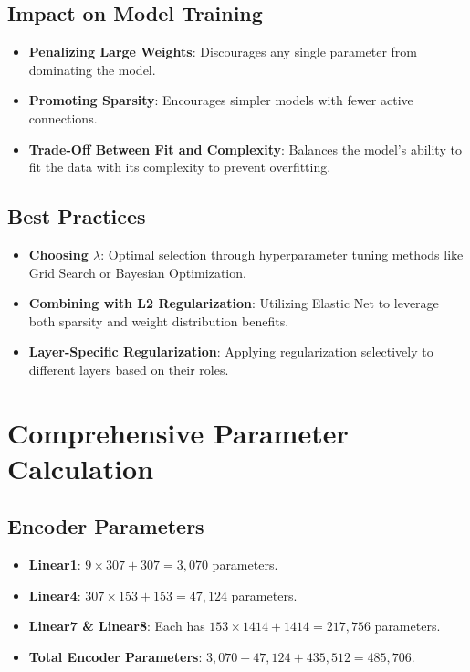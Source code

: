 \documentclass[10pt]{article}
\begin{document}
\subsection{Impact on Model Training}
\begin{itemize}
    \item \textbf{Penalizing Large Weights}: Discourages any single parameter from dominating the model.
    \item \textbf{Promoting Sparsity}: Encourages simpler models with fewer active connections.
    \item \textbf{Trade-Off Between Fit and Complexity}: Balances the model's ability to fit the data with its complexity to prevent overfitting.
\end{itemize}

\subsection{Best Practices}
\begin{itemize}
    \item \textbf{Choosing \( \lambda \)}: Optimal selection through hyperparameter tuning methods like Grid Search or Bayesian Optimization.
    \item \textbf{Combining with L2 Regularization}: Utilizing Elastic Net to leverage both sparsity and weight distribution benefits.
    \item \textbf{Layer-Specific Regularization}: Applying regularization selectively to different layers based on their roles.
\end{itemize}

\section{Comprehensive Parameter Calculation}

\subsection{Encoder Parameters}
\begin{itemize}
    \item \textbf{Linear1}: \( 9 \times 307 + 307 = 3,070 \) parameters.
    \item \textbf{Linear4}: \( 307 \times 153 + 153 = 47,124 \) parameters.
    \item \textbf{Linear7 \& Linear8}: Each has \( 153 \times 1414 + 1414 = 217,756 \) parameters.
    \item \textbf{Total Encoder Parameters}: \( 3,070 + 47,124 + 435,512 = 485,706 \).
\end{itemize}
\end{document}

